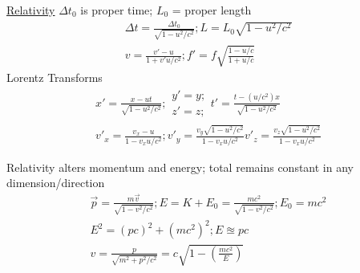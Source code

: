 \documentclass[8pt]{extarticle}
\begin{document}
    \underline{Relativity}
        $\Delta t_0$ is proper time; $L_0$ = proper length
        \begin{gather*}
            \Delta t = \frac{\Delta t_0}{\sqrt{1 - u^2/c^2}}; 
            L = L_0\sqrt{1 - u^2/c^2}\\
            v = \frac{v' - u}{1 + v'u/c^2}; 
            f' = f\sqrt{\frac{1 - u/c}{1 + u/c}}
        \end{gather*}
        Lorentz Transforms
        \footnotesize
        \begin{gather*}
            x' = \frac{x - ut}{\sqrt{1 - u^2/c^2}};
            \begin{matrix}
                y' = y;\\
                z' = z;
            \end{matrix}
            t' = \frac{t - (u/c^2)x}{\sqrt{1 - u^2/c^2}}\\
            v'_x = \frac{v_x - u}{1 - v_x u/c^2};
            v'_y = \frac{v_y \sqrt{1 - u^2 / c^2}}{1 - v_x u/c^2}
            v'_z = \frac{v_z \sqrt{1 - u^2 / c^2}}{1 - v_x u/c^2}
        \end{gather*}
        \normalsize

        Relativity alters momentum and energy; total remains constant in any dimension/direction
        \begin{gather*}
            \vec{p} = \frac{m\vec{v}}{\sqrt{1 - v^2/c^2}};
            E   =   K + E_0
                =   \frac{mc^2}{\sqrt{1 - v^2/c^2}};
            E_0 =   mc^2\\
            E^2 =   (pc)^2 + (mc^2)^2; E \approxeq pc\\
            v = \frac{p}{\sqrt{m^2 + p^2/c^2}} = c\sqrt{1 - \left( \frac{mc^2}{E} \right)}
        \end{gather*}
\end{document}
